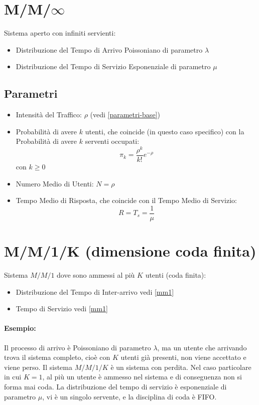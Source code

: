 \section{M/M/\texorpdfstring{$\infty$}{infinito}}

Sistema aperto con infiniti servienti:

\begin{itemize}
    \item Distribuzione del Tempo di Arrivo Poissoniano di parametro $\lambda$
    \item Distribuzione del Tempo di Servizio Esponenziale di parametro $\mu$
\end{itemize}

\subsection{Parametri}

\begin{itemize}
    \item Intensità del Traffico: $\rho$ (vedi \ref{parametri-base})
    \item Probabilità di avere $k$ utenti, che coincide (in questo caso
          specifico) con la Probabilità di avere $k$ serventi occupati: $$\pi_k =
              \frac{\rho^k}{k!} e^{-\rho}$$ con $k \geq 0$
    \item Numero Medio di Utenti: $N = \rho$
    \item Tempo Medio di Risposta, che coincide con il Tempo Medio di Servizio:
          $$R = T_s = \frac{1}{\mu}$$
\end{itemize}

\section{M/M/1/K (dimensione coda finita)}

Sistema $M/M/1$ dove sono ammessi al più $K$ utenti (coda finita):

\begin{itemize}
    \item Distribuzione del Tempo di Inter-arrivo vedi \ref{mm1}
    \item Tempo di Servizio vedi \ref{mm1}
\end{itemize}

\paragraph{Esempio:}
Il processo di arrivo è Poissoniano di parametro $\lambda$, ma un utente che arrivando
trova il sistema completo, cioè con $K$ utenti già presenti, non viene accettato e
viene perso. Il sistema $M/M/1/K$ è un sistema con perdita. Nel caso particolare
in cui $K=1$, al più un utente è ammesso nel sistema e di conseguenza non si forma
mai coda. La distribuzione del tempo di servizio è esponenziale di parametro $\mu$,
vi è un singolo servente, e la disciplina di coda è FIFO.


